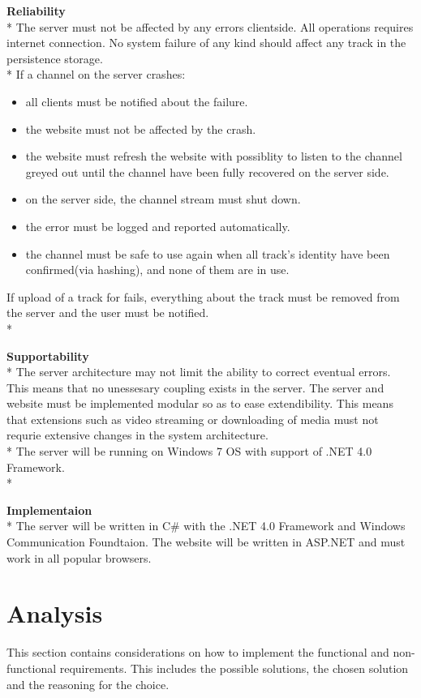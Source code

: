 \documentclass[a4paper,11pt,report]{article}
\begin{document}
\textbf{Reliability} \\*
The server must not be affected by any errors clientside. All operations requires internet connection. No system failure of any kind should affect any track in the persistence storage. \\*
If a channel on the server crashes:
\begin{itemize}
\item all clients must be notified about the failure.
\item the website must not be affected by the crash.
\item the website must refresh the website with possiblity to listen to the channel greyed out until the channel have been fully recovered on the server side.
\item on the server side, the channel stream must shut down.
\item the error must be logged and reported automatically. 
\item the channel must be safe to use again when all track's identity have been confirmed(via hashing), and none of them are in use.
\end{itemize}
If upload of a track for fails, everything about the track must be removed from the server and the user must be notified. \\*

\textbf{Supportability} \\*
The server architecture may not limit the ability to correct eventual errors. This means that no unessesary coupling exists in the server.
The server and website must be implemented modular so as to ease extendibility.
This means that extensions such as video streaming or downloading of media must not requrie extensive changes in the system architecture. \\*
The server will be running on Windows 7 OS with support of .NET 4.0 Framework.\\*

\textbf{Implementaion} \\*
The server will be written in C\# with the .NET 4.0 Framework and Windows Communication Foundtaion.
The website will be written in ASP.NET and must work in all popular browsers.

\section{Analysis}
This section contains considerations on how to implement the functional and non-functional requirements. This includes the possible solutions, the chosen solution and the reasoning for the choice.
\end{document}
